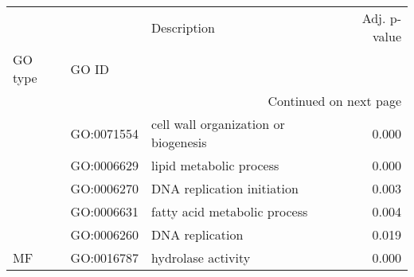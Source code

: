 \begin{longtable}{lllr}
\toprule
   &            &                           Description &  Adj. p-value \\
GO type & GO ID &                                       &               \\
\midrule
\endhead
\midrule
\multicolumn{4}{r}{{Continued on next page}} \\
\midrule
\endfoot

\bottomrule
\endlastfoot
\multirow{5}{*}{BP} & GO:0071554 &  cell wall organization or biogenesis &         0.000 \\
   & GO:0006629 &               lipid metabolic process &         0.000 \\
   & GO:0006270 &            DNA replication initiation &         0.003 \\
   & GO:0006631 &          fatty acid metabolic process &         0.004 \\
   & GO:0006260 &                       DNA replication &         0.019 \\
\cline{1-4}
MF & GO:0016787 &                    hydrolase activity &         0.000 \\
\end{longtable}
